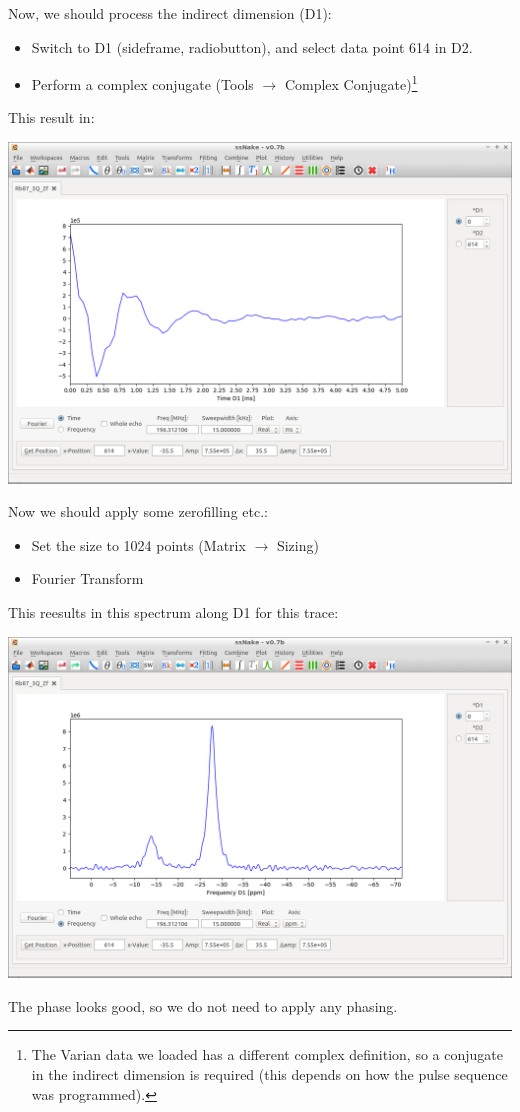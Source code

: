 \documentclass[11pt,a4paper]{article}
\begin{document}
Now, we should process the indirect dimension (D1):
\begin{itemize}
	\item Switch to D1 (sideframe, radiobutton), and select data point 614 in D2.
	\item Perform a complex conjugate (Tools $\longrightarrow$ Complex Conjugate)\footnote{The Varian data
	  we loaded has a different complex definition, so a conjugate in the indirect dimension is
	required (this depends on how the pulse sequence was programmed).}
\end{itemize}
This result in:
\begin{center}
\includegraphics[width=0.8\linewidth]{Figs/Fig3.png}
\end{center}
Now we should apply some zerofilling etc.:
\begin{itemize}
	\item Set the size to 1024 points (Matrix $\longrightarrow$ Sizing)
	\item Fourier Transform
\end{itemize}
This reesults in this spectrum along D1 for this trace:
\begin{center}
\includegraphics[width=0.8\linewidth]{Figs/Fig4.png}
\end{center}
The phase looks good, so we do not need to apply any phasing.
\end{document}
